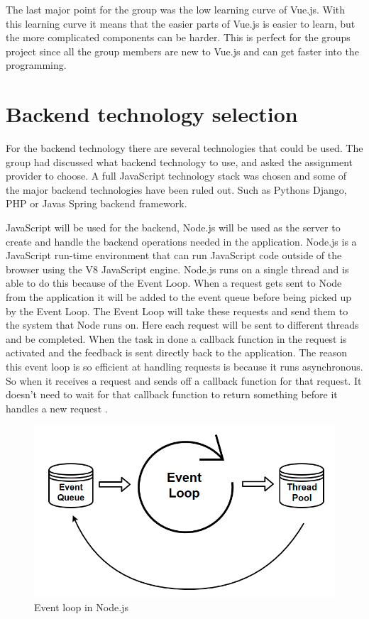 The last major point for the group was the low learning curve of Vue.js. With this learning curve it means that the easier parts of Vue.js is easier to learn, but the more complicated components can be harder. This is perfect for the groups project since all the group members are new to Vue.js and can get faster into the programming.

\section{Backend technology selection}
For the backend technology there are several technologies that could be used. The group had discussed what backend technology to use, and asked the assignment provider to choose. A full JavaScript technology stack was chosen and some of the major backend technologies have been ruled out. Such as Pythons Django, PHP or Javas Spring backend framework. 

JavaScript will be used for the backend, Node.js will be used as the server to create and handle the backend operations needed in the application. Node.js is a JavaScript run-time environment that can run JavaScript code outside of the browser using the V8 JavaScript engine. Node.js runs on a single thread and is able to do this because of the Event Loop. When a request gets sent to Node from the application it will be added to the event queue before being picked up by the Event Loop. The Event Loop will take these requests and send them to the system that Node runs on. Here each request will be sent to different threads and be completed. When the task in done a callback function in the request is activated and the feedback is sent directly back to the application. The reason this event loop is so efficient at handling requests is because it runs asynchronous. So when it receives a request and sends off a callback function for that request. It doesn't need to wait for that callback function to return something before it handles a new request \cite{Node-event-loop}.

\begin{figure}
    \centering
    \includegraphics[width=115mm,scale=1]{figures/event_loop.png}
    \caption{Event loop in Node.js}
    \label{fig:Node_Event_Loop}
\end{figure}
